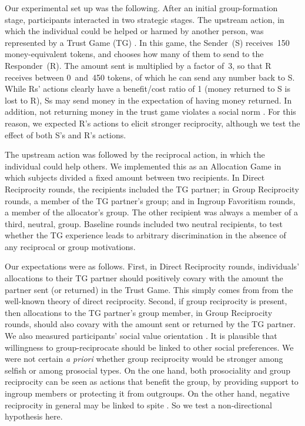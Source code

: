 \documentclass[12pt,a4paper]{article}\usepackage[]{graphicx}\usepackage[]{color}
\begin{document}
Our experimental set up was the following. After an initial group-formation stage, participants interacted in two strategic stages. The upstream action, in which the individual could be helped or harmed by another person, was represented by a Trust Game (TG) \citep{berg1995trust}.  In this game, the Sender~(S) receives~150 money-equivalent tokens, and chooses how many of them to send to the Responder~(R). The amount sent is multiplied by a factor of~3, so that R receives between 0~and~450 tokens, of which he can send any number back to S.  While
Rs' actions clearly have a benefit/cost ratio of 1 (money returned to S is lost to R), Ss may send money in the expectation of having
money returned. In addition, not returning money in the trust game violates a social norm \citep{kimbrough2015norms}. For
this reason, we expected R's actions to elicit stronger reciprocity, although we test the effect of both S's and R's actions.



The upstream action was followed by the reciprocal action, 
in which the individual could help others. We implemented this as an Allocation
Game in which subjects divided a fixed amount between two recipients.
In Direct Reciprocity rounds, the recipients included the TG partner;
in Group Reciprocity rounds, a member of the TG partner's group; and
in Ingroup Favoritism rounds, a member of the allocator's group.
The other recipient was always a member of a third, neutral, group.
Baseline rounds included two neutral recipients, to test whether the
TG experience leads to arbitrary discrimination in the absence of any reciprocal
or group motivations.

Our expectations were as follows. First, in Direct Reciprocity rounds, individuals' allocations to their TG partner
should positively covary with the amount the partner sent (or returned) in the Trust Game. This simply comes from
from the well-known theory of direct reciprocity. Second, if group reciprocity is present, then allocations to the TG partner's group member, in Group Reciprocity rounds, should also covary with the amount sent or returned by the TG partner.
We also measured participants' social value orientation \citep{van1999pursuit}. It is plausible that willingness to group-reciprocate should
be linked to other social preferences. We were not certain \emph{a priori} whether group reciprocity would be stronger
among selfish or among prosocial types. On the one hand, both prosociality and group reciprocity can be seen as actions
that benefit the group, by providing support to ingroup members or protecting it from outgroups. On the other hand,
negative reciprocity in general may be linked to spite \citep{johnstone2004evolution}. So we test a non-directional hypothesis here.
\end{document}
